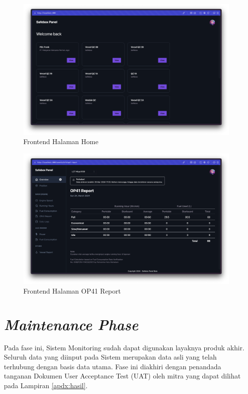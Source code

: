 \begin{figure}[!h]
    \includegraphics[width=1.05\linewidth, center]{images/hasil/iterations/5/fe-home.png}
    \caption{Frontend Halaman Home}
    \label{fig:fe-home}
\end{figure}

\begin{figure}[!h]
    \includegraphics[width=1.05\linewidth, center]{images/hasil/iterations/5/fe-op41.png}
    \caption{Frontend Halaman OP41 Report}
    \label{fig:fe-op41}
\end{figure}

\section{\textit{Maintenance Phase}}

Pada fase ini, Sistem Monitoring sudah dapat digunakan layaknya produk akhir. Seluruh data yang diinput pada Sistem merupakan data asli yang telah terhubung dengan basis data utama. Fase ini diakhiri dengan penandada tanganan Dokumen User Acceptance Test (UAT) oleh mitra yang dapat dilihat pada Lampiran \ref{apdx:hasil}.

